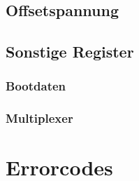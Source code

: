 \documentclass[a4paper,12pt]{article}
\begin{document}
\lstset{style=C}

\subsection{Offsetspannung}
\subsection{Sonstige Register}
\subsubsection{Bootdaten}
\subsubsection{Multiplexer}
\section{Errorcodes}
\end{document}
